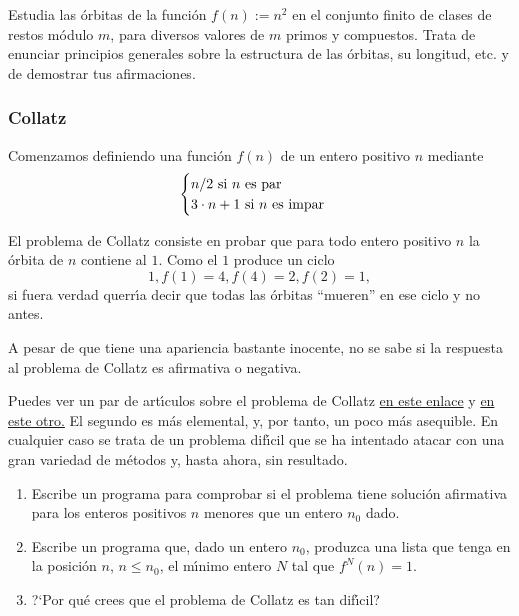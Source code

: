 \par
\medskip
\par
\begin{ejer}
Estudia las \'orbitas de la funci\'on $f(n):=n^2$ en el conjunto finito de
clases de restos m\'odulo $m$, 
para diversos valores de $m$ primos y compuestos. Trata de enunciar principios
generales sobre la estructura de las \'orbitas, su longitud, etc. y de demostrar
tus afirmaciones. 
\end{ejer}



\subsubsection{Collatz}



Comenzamos definiendo  una funci\'on $f(n)$ de un entero positivo $n$ mediante 
\begin{equation}\notag
\begin{cases}
 n/2 \text{ si $n$ es par}\\
 3\cdot n+1 \text{ si $n$ es impar}
\end{cases}
\end{equation}

El problema de Collatz consiste en probar que para todo entero  positivo $n$ la
\'orbita de $n$ contiene al $1$. Como el $1$ produce un ciclo 
\[1,f(1)=4,f(4)=2,f(2)=1,\]
\noindent si fuera verdad querr\'{\i}a decir que todas las \'orbitas ``mueren''
en ese ciclo y no antes.

A pesar de que tiene una apariencia bastante inocente, {\sc no se sabe} si la
respuesta al problema de Collatz es afirmativa o negativa. 

Puedes ver un par de art\'{\i}culos sobre el problema de Collatz 
\href{http://150.244.21.37/PDFs/PROGR/collatz-conj.pdf}{en este enlace} y 
\href{http://150.244.21.37/PDFs/PROGR/collatz-conj2.pdf}{en este otro.} El segundo es m\'as
elemental, y, por tanto, un poco m\'as asequible. En cualquier caso se trata de
un problema dif\'{\i}cil que se ha intentado atacar con una gran variedad de
m\'etodos y, hasta ahora, sin resultado.

\par
\medskip
\par

\begin{ejer}
\begin{enumerate}

\item Escribe un programa para comprobar si  el problema tiene soluci\'on
afirmativa  para los enteros positivos $n$ menores que un entero $n_0$ dado. 

\item Escribe un programa que, dado un entero $n_0$,  produzca una lista que
tenga en la posici\'on $n$, $n\le n_0$,  el m\'{\i}nimo entero $N$ tal que
$f^N(n)=1.$

\item ?`Por qu\'e crees que el problema de Collatz es tan dif\'{\i}cil?

 
 \end{enumerate}
 \end{ejer}

